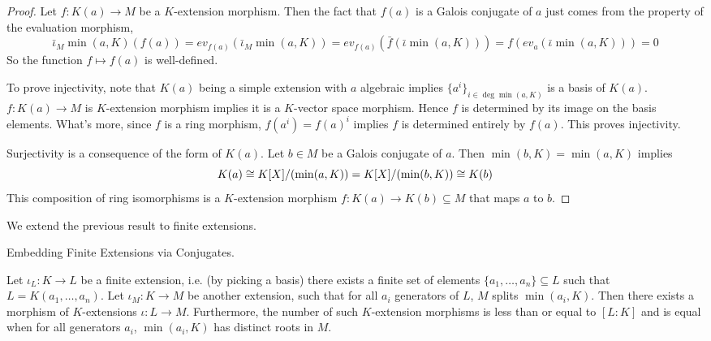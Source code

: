 \documentclass[../book.tex]{subfiles}
\begin{document}
\begin{proof}
    Let $f : K(a) \to M$ be a $K$-extension morphism. 
    Then the fact that $f(a)$ is a Galois conjugate of $a$ just comes from
    the property of the evaluation morphism, 
    \[
        \bar\iota_M \min(a,K) (f(a)) = ev_{f(a)}(\bar\iota_M \min(a,K))
        = ev_{f(a)} (\bar{f}(\bar\iota \min(a,K))) 
        = f(ev_a (\bar\iota \min(a,K))) = 0
    \]
    So the function $f \mapsto f(a)$ is well-defined. 
    
    To prove injectivity, note that $K(a)$ being a simple extension with
    $a$ algebraic implies $\{a^i\}_{i\in\deg\min(a,K)}$ is a basis of $K(a)$. 
    $f : K(a) \to M$ is $K$-extension morphism implies 
    it is a $K$-vector space morphism. 
    Hence $f$ is determined by its image on the basis elements. 
    What's more, since $f$ is a ring morphism, 
    $f(a^i) = f(a)^i$ implies $f$ is determined entirely by $f(a)$. 
    This proves injectivity. 
    
    Surjectivity is a consequence of the form of $K(a)$.
    Let $b \in M$ be a Galois conjugate of $a$. 
    Then $\min(b,K) = \min(a,K)$ implies \[
        K(a) \cong K[X]/(\min(a,K)) = K[X]/(\min(b,K)) \cong K(b)
    \]
    This composition of ring isomorphisms is a $K$-extension morphism 
    $f : K(a) \to K(b) \subseteq M$ that maps $a$ to $b$. 
\end{proof}
\begin{rmk}
    We extend the previous result to finite extensions. 
\end{rmk}
\begin{thm} Embedding Finite Extensions via Conjugates.
    
    Let $\iota_L : K \to L$ be a finite extension, i.e. (by picking a basis)
    there exists a finite set of elements $\{a_1,\dots,a_n\} \subseteq L$ such that 
    $L = K(a_1, \dots, a_n)$. 
    Let $\iota_M : K \to M$ be another extension, such that 
    for all $a_i$ generators of $L$, $M$ splits $\min(a_i,K)$. 
    Then there exists a morphism of $K$-extensions $\iota : L \to M$.
    Furthermore, the number of such $K$-extension morphisms is less than or equal
    to $[L : K]$ and is equal when for all generators $a_i$, 
    $\min(a_i,K)$ has distinct roots in $M$. 
\end{thm}
\end{document}
